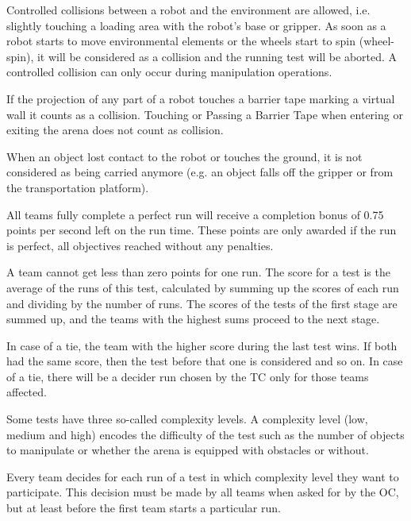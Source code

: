 Controlled collisions between a robot and the environment are allowed, i.e. slightly touching a loading area with the robot’s base or gripper. As soon as a robot starts to move environmental elements or the wheels start to spin (wheel-spin), it will be considered as a collision and the running test will be aborted. A controlled collision can only occur during manipulation operations. 
\par
If the projection of any part of a robot touches a barrier tape marking a virtual wall it counts as a collision. Touching or Passing a Barrier Tape when entering or exiting the arena does not count as collision.
\par
When an object lost contact to the robot or touches the ground, it is not considered as being carried anymore (e.g. an object falls off the gripper or from the transportation platform).
\par
All teams fully complete a perfect run will receive a completion bonus of 0.75 points per second left on the run time. These points are only awarded if the run is perfect, all objectives reached without any penalties.
\par
A team cannot get less than zero points for one run. The score for a test is the average of the runs of this test, calculated by summing up the scores of each run and dividing by the number of runs. The scores of the tests of the first stage are summed up, and the teams with the highest sums proceed to the next stage.
\par
In case of a tie, the team with the higher score during the last test wins. If both had the same score, then the test before that one is considered and so on. In case of a tie, there will be a decider run chosen by the TC only for those teams affected.
\par
Some tests have three so-called complexity levels. A complexity level (low, medium and high) encodes the difficulty of the test such as the number of objects to manipulate or whether the arena is equipped with obstacles or without. 
\par
Every team decides for each run of a test in which complexity level they want to participate. This decision must be made by all teams when asked for by the OC, but at least before the first team starts a particular run.

